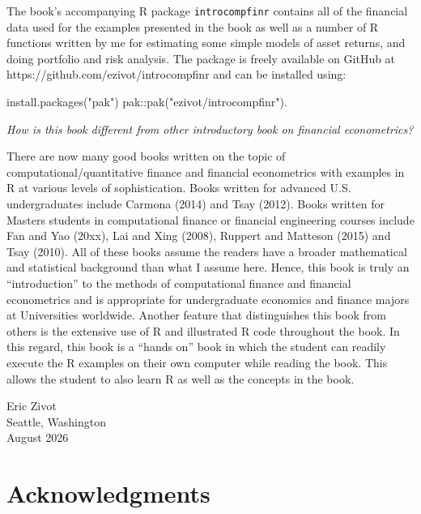 \documentclass[
  letterpaper,
  DIV=11,
  numbers=noendperiod]{scrreprt}
\newenvironment{Shaded}{\begin{snugshade}}{\end{snugshade}}
\newcommand{\FunctionTok}[1]{\textcolor[rgb]{0.28,0.35,0.67}{#1}}
\newcommand{\NormalTok}[1]{\textcolor[rgb]{0.00,0.23,0.31}{#1}}
\newcommand{\SpecialCharTok}[1]{\textcolor[rgb]{0.37,0.37,0.37}{#1}}
\newcommand{\StringTok}[1]{\textcolor[rgb]{0.13,0.47,0.30}{#1}}
\theoremstyle{definition}
\theoremstyle{definition}
\theoremstyle{remark}
\begin{document}
The book's accompanying R package \texttt{introcompfinr} contains all of
the financial data used for the examples presented in the book as well
as a number of R functions written by me for estimating some simple
models of asset returns, and doing portfolio and risk analysis. The
package is freely available on GitHub at
https://github.com/ezivot/introcompfinr and can be installed using:

\begin{Shaded}
\begin{Highlighting}[]
\FunctionTok{install.packages}\NormalTok{(}\StringTok{"pak"}\NormalTok{)}
\NormalTok{pak}\SpecialCharTok{::}\FunctionTok{pak}\NormalTok{(}\StringTok{"ezivot/introcompfinr"}\NormalTok{).}
\end{Highlighting}
\end{Shaded}

\emph{How is this book different from other introductory book on
financial econometrics?}

There are now many good books written on the topic of
computational/quantitative finance and financial econometrics with
examples in R at various levels of sophistication. Books written for
advanced U.S. undergraduates include Carmona (2014) and Tsay (2012).
Books written for Masters students in computational finance or financial
engineering courses include Fan and Yao (20xx), Lai and Xing (2008),
Ruppert and Matteson (2015) and Tsay (2010). All of these books assume
the readers have a broader mathematical and statistical background than
what I assume here. Hence, this book is truly an ``introduction'' to the
methods of computational finance and financial econometrics and is
appropriate for undergraduate economics and finance majors at
Universities worldwide. Another feature that distinguishes this book
from others is the extensive use of R and illustrated R code throughout
the book. In this regard, this book is a ``hands on'' book in which the
student can readily execute the R examples on their own computer while
reading the book. This allows the student to also learn R as well as the
concepts in the book.

Eric Zivot\\
Seattle, Washington\\
August 2026


\hypertarget{acknowledgments}{%
\chapter*{Acknowledgments}\label{acknowledgments}}
\end{document}
